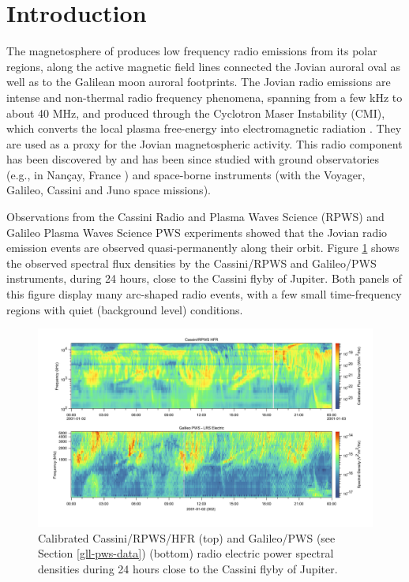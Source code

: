 \documentclass[referee]{aa}
\begin{document}
\section{Introduction} %

The magnetosphere of  produces low frequency radio emissions from its polar regions, along the active magnetic field lines connected the Jovian auroral oval as well as to the Galilean moon auroral footprints. The Jovian radio emissions are intense and non-thermal radio frequency phenomena, spanning from a few kHz to about 40 MHz, and produced through the Cyclotron Maser Instability (CMI), which converts the local plasma free-energy into electromagnetic radiation \citep{zarka_ASR_92}. They are used as a proxy for the Jovian magnetospheric activity. This radio component has been discovered by \citet{burke_JGR_55} and has been since studied with ground observatories (e.g., in Nan\c cay, France \citep{2017pre8.conf..455L}) and space-borne instruments (with the Voyager, Galileo, Cassini and Juno space missions). 

Observations from the Cassini Radio and Plasma Waves Science (RPWS) \citep{gurnett_SSR_92} and Galileo Plasma Waves Science PWS \citep{gurnett_SSR_92} experiments showed that the Jovian radio emission events are observed quasi-permanently along their orbit. Figure \ref{fig:cas-gll-continuous-radio} shows the observed spectral flux densities by the Cassini/RPWS and Galileo/PWS instruments, during 24 hours, close to the Cassini flyby of Jupiter. Both panels of this figure display many arc-shaped radio events, with a few small time-frequency regions with quiet (background level) conditions. 

\begin{figure}
\includegraphics[width=\linewidth]{figure-gll-cas.pdf}
\caption{Calibrated Cassini/RPWS/HFR \citep{zarka_JGR_04,https://doi.org/10.25935/h98j-ma66} (top) and Galileo/PWS (see Section \ref{gll-pws-data}) (bottom) radio electric power spectral densities during 24 hours close to the Cassini flyby of Jupiter.}\label{fig:cas-gll-continuous-radio}
\end{figure}
\end{document}
